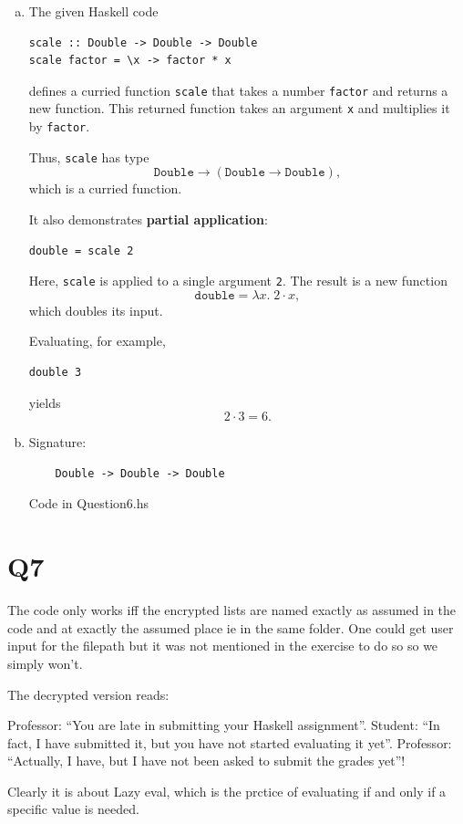\documentclass{article}
\begin{document}
\begin{enumerate}[(a)]
\item
The given Haskell code
\begin{verbatim}
scale :: Double -> Double -> Double
scale factor = \x -> factor * x
\end{verbatim}
defines a curried function \texttt{scale} that takes a number \texttt{factor} and returns a new function. This returned function takes an argument \texttt{x} and multiplies it by \texttt{factor}.

Thus, \texttt{scale} has type
\[
\texttt{Double} \to (\texttt{Double} \to \texttt{Double}),
\]
which is a curried function.

It also demonstrates \textbf{partial application}:
\begin{verbatim}
double = scale 2
\end{verbatim}
Here, \texttt{scale} is applied to a single argument \texttt{2}. The result is a new function
\[
\texttt{double} = \lambda x.\; 2 \cdot x,
\]
which doubles its input.

Evaluating, for example,
\begin{verbatim}
double 3
\end{verbatim}
yields
\[
2 \cdot 3 = 6.
\]
\item Signature:
\begin{verbatim}
    Double -> Double -> Double
\end{verbatim}
Code in Question6.hs
\end{enumerate}

\section*{Q7}
The code only works iff the encrypted lists are named exactly as assumed in the code and at exactly the assumed place ie in the same folder. One could get user input for the filepath but it was not mentioned in the exercise to do so so we simply won't.

The decrypted version reads: 

Professor: ``You are late in submitting your Haskell assignment''.
Student: ``In fact, I have submitted it, but you have not started evaluating it yet''.
Professor: ``Actually, I have, but I have not been asked to submit the grades yet''!

Clearly it is about Lazy eval, which is the prctice of evaluating if and only if a specific value is needed.
\end{document}
